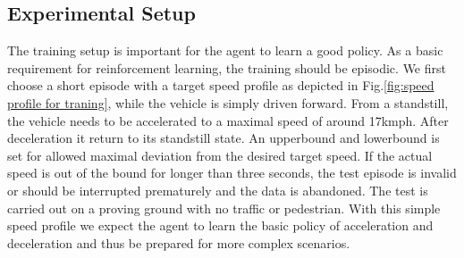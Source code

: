 \documentclass{article}
\begin{document}
%	
%	


\subsection{Experimental Setup}\label{sec:setup}

The training setup is important for the agent to learn a good policy. As a basic requirement for reinforcement learning, the training should be episodic. We first choose a short episode with a target speed profile as depicted in Fig.\@\ref{fig:speed profile for traning}, while the vehicle is simply driven forward. From a standstill, the vehicle needs to be accelerated to a maximal speed of around 17kmph. After deceleration it return to its standstill state. An upperbound and lowerbound is set for allowed maximal deviation from the desired target speed. If the actual speed is out of the bound for longer than three seconds, the test episode is invalid or should be interrupted prematurely and the data is abandoned. The test is carried out on a proving ground with no traffic or pedestrian. With this simple speed profile we expect the agent to learn the basic policy of acceleration and deceleration and thus be prepared for more complex scenarios.
\end{document}
